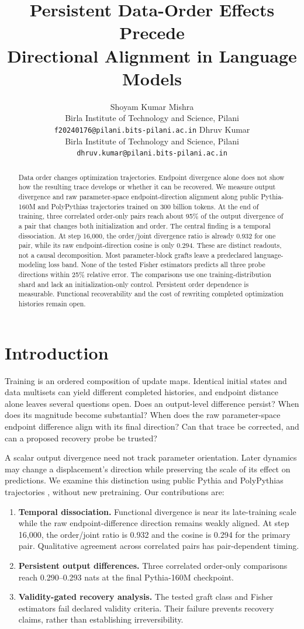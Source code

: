 \documentclass{article}
\title{Persistent Data-Order Effects Precede\\Directional Alignment in Language Models}
\author{%
  Shoyam Kumar Mishra\\
  Birla Institute of Technology and Science, Pilani\\
  \texttt{f20240176@pilani.bits-pilani.ac.in}
  \And
  Dhruv Kumar\\
  Birla Institute of Technology and Science, Pilani\\
  \texttt{dhruv.kumar@pilani.bits-pilani.ac.in}
}
\begin{document}
\maketitle
\begin{abstract}
Data order changes optimization trajectories. Endpoint divergence alone does not show how the resulting trace develops or whether it can be recovered. We measure output divergence and raw parameter-space endpoint-direction alignment along public Pythia-160M and PolyPythias trajectories trained on 300 billion tokens. At the end of training, three correlated order-only pairs reach about 95\% of the output divergence of a pair that changes both initialization and order. The central finding is a temporal dissociation. At step 16,000, the order/joint divergence ratio is already 0.932 for one pair, while its raw endpoint-direction cosine is only 0.294. These are distinct readouts, not a causal decomposition. Most parameter-block grafts leave a predeclared language-modeling loss band. None of the tested Fisher estimators predicts all three probe directions within 25\% relative error. The comparisons use one training-distribution shard and lack an initialization-only control. Persistent order dependence is measurable. Functional recoverability and the cost of rewriting completed optimization histories remain open.
\end{abstract}

\section{Introduction}
Training is an ordered composition of update maps. Identical initial states and data multisets can yield different completed histories, and endpoint distance alone leaves several questions open. Does an output-level difference persist? When does its magnitude become substantial? When does the raw parameter-space endpoint difference align with its final direction? Can that trace be corrected, and can a proposed recovery probe be trusted?

A scalar output divergence need not track parameter orientation. Later dynamics may change a displacement's direction while preserving the scale of its effect on predictions. We examine this distinction using public Pythia and PolyPythias trajectories \citep{pythia,polypythias}, without new pretraining. Our contributions are:
\begin{enumerate}
\item \textbf{Temporal dissociation.} Functional divergence is near its late-training scale while the raw endpoint-difference direction remains weakly aligned. At step 16,000, the order/joint ratio is 0.932 and the cosine is 0.294 for the primary pair. Qualitative agreement across correlated pairs has pair-dependent timing.
\item \textbf{Persistent output differences.} Three correlated order-only comparisons reach 0.290--0.293 nats at the final Pythia-160M checkpoint.
\item \textbf{Validity-gated recovery analysis.} The tested graft class and Fisher estimators fail declared validity criteria. Their failure prevents recovery claims, rather than establishing irreversibility.
\end{enumerate}
\end{document}
